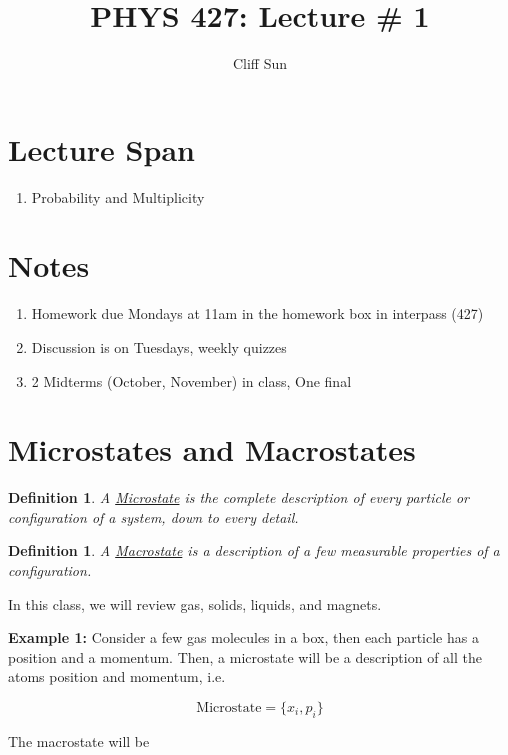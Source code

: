 \documentclass{article}
\title{PHYS 427: Lecture \# 1}
\author{Cliff Sun}
\newtheorem{definition}[theorem]{Definition}
\newtheorem{one minute paper}[theorem]{One Minute Paper}
\begin{document}
\maketitle

\section*{Lecture Span}
\begin{enumerate}
    \item Probability and Multiplicity
\end{enumerate}

\section*{Notes}
\begin{enumerate}
    \item Homework due Mondays at 11am in the homework box in interpass (427)
    \item Discussion is on Tuesdays, weekly quizzes
    \item 2 Midterms (October, November) in class, One final
\end{enumerate}

\section*{Microstates and Macrostates}

\begin{definition}
    A \underline{Microstate} is the complete description of every particle or configuration of a system, down to every detail. 
\end{definition}

\begin{definition}
    A \underline{Macrostate} is a description of a few measurable properties of a configuration. 
\end{definition}

In this class, we will review gas, solids, liquids, and magnets. 

\textbf{Example 1:} Consider a few gas molecules in a box, then each particle has a position and a momentum. Then, a microstate will be a description of all the atoms position and momentum, i.e. 

\begin{equation}
    \text{Microstate} = \{x_i, p_i\}
\end{equation}

The macrostate will be 
\end{document}
